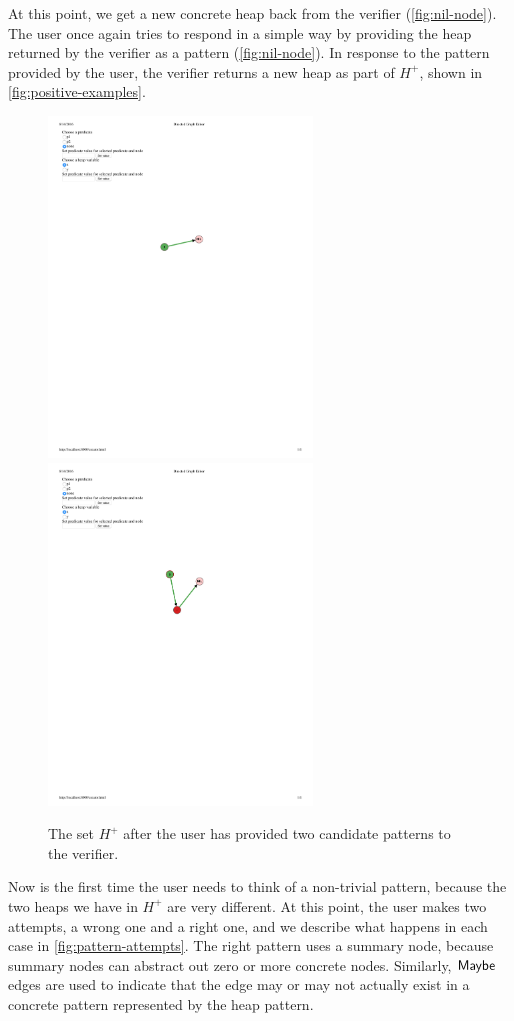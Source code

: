 At this point, we get a new concrete heap back from the verifier (\autoref{fig:nil-node}). The user once again tries to respond in a simple way by providing the heap returned by the verifier as a pattern (\autoref{fig:nil-node}). In response to the pattern provided by the user, the verifier returns a new heap as part of $H^{+}$, shown in \autoref{fig:positive-examples}.

\begin{figure}
  \centering
  \includegraphics[width=7cm]{fig/positive1.pdf}
  \includegraphics[width=7cm]{fig/positive2.pdf}
  \caption{The set $H^{+}$ after the user has provided two candidate patterns to the verifier.}
  \label{fig:positive-examples}
\end{figure}

Now is the first time the user needs to think of a non-trivial pattern, because the two heaps we have in $H^{+}$ are very different. At this point, the user makes two attempts, a wrong one and a right one, and we describe what happens in each case in \autoref{fig:pattern-attempts}. The right pattern uses a summary node, because summary nodes can abstract out zero or more concrete nodes. Similarly, $\mathsf{Maybe}$ edges are used to indicate that the edge may or may not actually exist in a concrete pattern represented by the heap pattern.


